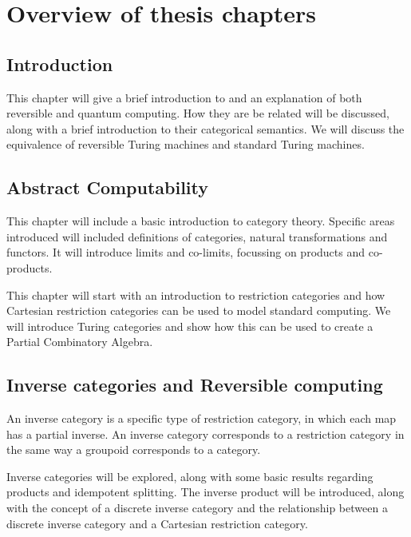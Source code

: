 \chapter*{Overview of thesis chapters}

\section*{Introduction}

This chapter will give a brief introduction to and an explanation of both reversible and quantum
computing. How they are be related will be discussed, along with a brief introduction to their
categorical semantics. We will discuss the equivalence of reversible Turing machines and
standard Turing machines.



\section*{Abstract Computability}

This chapter will include a basic introduction to category theory. Specific areas introduced will
included definitions of categories, natural transformations and functors. It will introduce limits
and co-limits, focussing on products and co-products.

This chapter will start with an introduction to restriction categories and how Cartesian restriction
categories can be used to model standard computing. We will introduce Turing categories and show how
this can be used to create a Partial Combinatory Algebra.

\section*{Inverse categories and Reversible computing}

An inverse category is a specific type of restriction category, in which each map has a partial
inverse. An inverse category corresponds to a restriction category in the same way a groupoid
corresponds to a category.

Inverse categories will be explored, along with some basic results regarding products and idempotent
splitting. The inverse product will be introduced, along with the concept of a discrete inverse
category and the relationship between a discrete inverse category and a Cartesian restriction
category.

